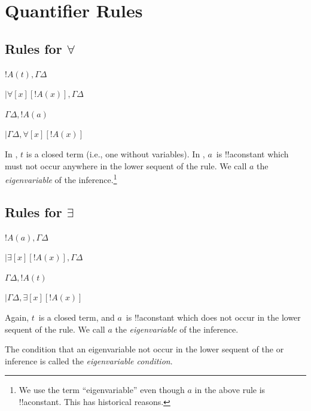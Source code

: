 \documentclass[10pt,a4paper]{article}
\theoremstyle{plain}
\theoremstyle{definition}
\theoremstyle{remark}
\newcommand*{\olfileid}[3]{}
\newcommand*{\olsection}[1]{\section*{#1}}
\providecommand{\RightLabel}[1]{}
\providecommand{\DisplayProof}{}
\providecommand{\fCenter}{}
\providecommand{\lforall}{\mathord{\forall}}
\providecommand{\lexists}{\mathord{\exists}}
\providecommand{\LeftR}[1]{}
\providecommand{\RightR}[1]{}
\providecommand{\UnaryInf}{\ensuremath{\mid}}
\providecommand{\RightR}{\mathrm{R}}
\providecommand{\LeftR}{\mathrm{L}}
\providecommand{\Axiom}{\mathrm{Ax}}
\begin{document}
\olfileid{fol}{seq}{qrl}

\olsection{Quantifier Rules}

\subsection{Rules for $\lforall$}

\begin{defish}
\Axiom$ !A(t), \Gamma \fCenter \Delta$
\RightLabel{\LeftR{\lforall}}
\UnaryInf$ \lforall[x][!A(x)],\Gamma \fCenter \Delta$
\DisplayProof
\hfill
\Axiom$ \Gamma \fCenter \Delta, !A(a) $
\RightLabel{\RightR{\lforall}}
\UnaryInf$ \Gamma \fCenter \Delta, \lforall[x][!A(x)]$
\DisplayProof
\end{defish}

In \LeftR{\lforall}, $t$ is a closed term (i.e., one without
variables). In \RightR{\lforall}, $a$~is !!a{constant} which must not
occur anywhere in the lower sequent of the \RightR{\lforall} rule. We
call $a$ the \emph{eigenvariable} of the \RightR{\forall}
inference.\footnote{We use the term ``eigenvariable'' even though $a$
in the above rule is !!a{constant}. This has historical reasons.}

\subsection{Rules for $\lexists$}

\begin{defish}
\Axiom$ !A(a), \Gamma \fCenter \Delta $
\RightLabel{\LeftR{\lexists}}
\UnaryInf$ \lexists[x][!A(x)], \Gamma \fCenter \Delta$
\DisplayProof
\hfill
\Axiom$ \Gamma \fCenter \Delta, !A(t) $
\RightLabel{\RightR{\lexists}}
\UnaryInf$ \Gamma \fCenter \Delta, \lexists[x][!A(x)]$
\DisplayProof
\end{defish}

Again, $t$~is a closed term, and $a$~is !!a{constant} which does not
occur in the lower sequent of the \LeftR{\lexists} rule. We call $a$
the \emph{eigenvariable} of the \LeftR{\lexists} inference.

The condition that an eigenvariable not occur in the lower sequent of
the \RightR{\lforall} or \LeftR{\lexists} inference is called the
\emph{eigenvariable condition}.
\end{document}
